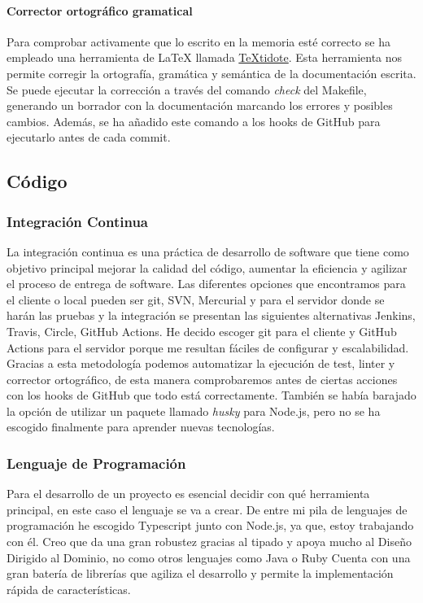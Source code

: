 \paragraph*{Corrector ortográfico gramatical}
Para comprobar activamente que lo escrito en la memoria esté correcto se ha empleado una herramienta de LaTeX llamada \href{https://github.com/sylvainhalle/textidote}{TeXtidote}.
Esta herramienta nos permite corregir la ortografía, gramática y semántica de la documentación escrita. Se puede ejecutar la corrección a través del comando \textit{check} del Makefile,
generando un borrador con la documentación marcando los errores y posibles cambios. Además, se ha añadido este comando a los hooks de GitHub para ejecutarlo antes de cada commit.

\subsection{Código}

\subsubsection*{Integración Continua}
La integración continua es una práctica de desarrollo de software que tiene como objetivo principal mejorar la calidad del código, aumentar la eficiencia y agilizar el proceso de entrega de software.
Las diferentes opciones que encontramos para el cliente o local pueden ser git, SVN, Mercurial y para el servidor donde se harán las pruebas y la integración se presentan las siguientes
alternativas Jenkins, Travis, Circle, GitHub Actions. He decido escoger git para el cliente y GitHub Actions para el servidor porque me resultan fáciles de configurar y escalabilidad.
Gracias a esta metodología podemos automatizar la ejecución de test, linter y corrector ortográfico, de esta manera comprobaremos antes de ciertas acciones con los hooks de GitHub que todo está
correctamente. También se había barajado la opción de utilizar un paquete llamado \textit{husky} para Node.js, pero no se ha escogido finalmente para aprender nuevas tecnologías.


\subsubsection*{Lenguaje de Programación}
Para el desarrollo de un proyecto es esencial decidir con qué herramienta principal, en este caso el lenguaje se va a crear. De entre mi pila de lenguajes de programación he
escogido Typescript junto con Node.js, ya que, estoy trabajando con él. Creo que da una gran robustez gracias al tipado y apoya mucho al Diseño Dirigido al Dominio, no como otros lenguajes como Java o Ruby
Cuenta con una gran batería de librerías que agiliza el desarrollo y permite la implementación rápida de características.


